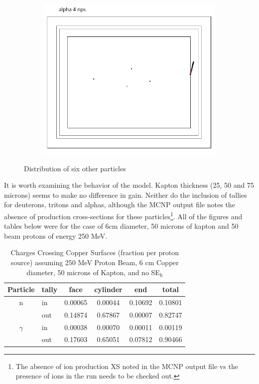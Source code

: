 \documentclass{mc2015}
\begin{document}
\begin{figure}[H]
\begin{subfigure}[b]{0.2\textwidth}
        \end{subfigure}
        \begin{subfigure}[b]{0.2\textwidth}
                \includegraphics[width=\textwidth]{figures/fig_mcnp_dist_a.png}
                \label{fig:mcnp_dist_a}
        \end{subfigure}
        \caption{Distribution of six other particles}
        \label{fig:mcnp_dist}
\end{figure}

It is worth examining the behavior of the model. Kapton thickness (25, 50 and 75 microns) seems to make no difference in gain. Neither do the inclusion of tallies for deuterons, tritons and alphas, although the MCNP output file notes the absence of production cross-sections for these particles\footnote{The absence of ion production XS noted in the MCNP output file vs the presence of ions in the run needs to be checked out.}. All of the figures and tables below were for the case of 6cm diameter, 50 microns of kapton and 50 beam protons of energy 250 MeV.

\begin{table}
  \centering
  \caption{Charges Crossing Copper Surfaces (fraction per proton source) assuming 250 MeV Proton Beam, 6 cm Copper diameter, 50 microns of Kapton, and no SE$_\text{h}$}
  \begin{tabular}{clcccc}
    \toprule
    Particle & tally & face & cylinder & end & total \\
    \midrule
    n  & in & \num{0.00065} & \num{0.00044} & \num{0.10692} & \num{0.10801} \\
       & out & \num{0.14874} & \num{0.67867} & \num{0.00007} & \num{0.82747} \\
    \midrule
    $\gamma$ & in & \num{0.00038} & \num{0.00070} & \num{0.00011} & \num{0.00119} \\
             & out & \num{0.17603} & \num{0.65051} & \num{0.07812} & \num{0.90466} \\
    \bottomrule
  \end{tabular}
  \label{tab:mcnp_neutral_crossing}
\end{table}
\end{document}
